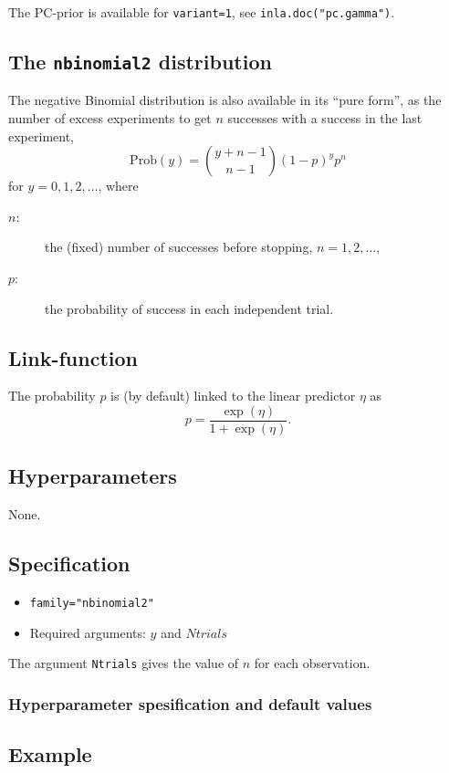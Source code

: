 \documentclass[a4paper,11pt]{article}
\begin{document}
The PC-prior is available for \verb|variant=1|, see
\verb|inla.doc("pc.gamma")|.

\clearpage


\subsection*{The \texttt{nbinomial2} distribution}

The negative Binomial distribution is also available in its ``pure
form'', as the number of excess experiments to get $n$ successes with
a success in the last experiment,
\begin{displaymath}
    \text{Prob}(y) = {y + n -1 \choose n-1} (1-p)^{y} p^{n}
\end{displaymath}
for $y=0, 1, 2, \ldots$, where
\begin{description}
\item[$n$:] the (fixed) number of successes before stopping,
    $n=1, 2, \ldots$,
\item[$p$:] the probability of success in each independent trial.
\end{description}

\subsection*{Link-function}

The probability $p$ is (by default) linked to the linear predictor
$\eta$ as
\begin{displaymath}
    p = \frac{\exp(\eta)}{1+\exp(\eta)}.
\end{displaymath}

\subsection*{Hyperparameters}
None.

\subsection*{Specification}

\begin{itemize}
\item \texttt{family="nbinomial2"}
\item Required arguments: $y$ and $Ntrials$
\end{itemize}
The argument \texttt{Ntrials} gives the value of $n$ for each
observation.

\subsubsection*{Hyperparameter spesification and default values}


\subsection*{Example}

\end{document}
